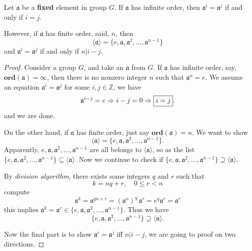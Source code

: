 \begin{theorem}
    Let $\mathfrak{a}$ be a \textbf{fixed} element in group $G$. If $\mathfrak{a}$ has infinite order, then $\mathfrak{a}^i = \mathfrak{a}^j$
    if and only if $i = j$.

    However, if $\mathfrak{a}$ has finite order, said, $n$, then 
    \begin{equation}
        \langle \mathfrak{a} \rangle = \{ e, \mathfrak{a}, \mathfrak{a}^2, \ldots, \mathfrak{a}^{n-1} \}
    \end{equation}
    and $\mathfrak{a}^i = \mathfrak{a}^j$
    if and only if $n | i - j$.
\end{theorem}
\begin{proof}
    Consider a group $G$, and take an $\mathfrak{a}$ from $G$. If $\mathfrak{a}$ has infinite order, say, 
    $\textbf{ord}(\mathfrak{a}) = \infty$, then there is no nonzero integer $n$ such that $\mathfrak{a}^n = e$.
    We assume an equation $\mathfrak{a}^i = \mathfrak{a}^j$ for some $i,j \in \mathbb{Z}$, we have 
    \[
        \mathfrak{a}^{i-j} = e \Rightarrow i - j = 0 \Rightarrow \fbox{$i = j$}.
    \]
    and we are done.

    On the other hand, if $\mathfrak{a}$ has finite order, just say $\textbf{ord}(\mathfrak{a}) = n$. We want to show 
    \[
        \langle \mathfrak{a} \rangle = \{ e, \mathfrak{a}, \mathfrak{a}^2, \ldots, \mathfrak{a}^{n-1} \}.
    \]
    Apparently, $e, \mathfrak{a}, \mathfrak{a}^2, \ldots, \mathfrak{a}^{n-1}$ are all belongs to $\langle \mathfrak{a} \rangle$, so as the list 
    $\{ e, \mathfrak{a}, \mathfrak{a}^2, \ldots, \mathfrak{a}^{n-1} \} \subseteq \langle \mathfrak{a} \rangle$.
    Now we continue to check if $\{ e, \mathfrak{a}, \mathfrak{a}^2, \ldots, \mathfrak{a}^{n-1} \} \supseteq \langle \mathfrak{a} \rangle$.

    By \textit{division algorithm}, there exists some integers $q$ and $r$ such that 
    \[
        k = nq + r,\quad  0 \leq r < n
    \]
    compute 
    \[
        \mathfrak{a}^k = \mathfrak{a}^{qn+r} = (\mathfrak{a}^n)^{q}\, \mathfrak{a}^r = e^q \mathfrak{a}^r = \mathfrak{a}^r
    \]
    this implies $\mathfrak{a}^k = \mathfrak{a}^r \in \{ e, \mathfrak{a}, \mathfrak{a}^2, \ldots, \mathfrak{a}^{n-1} \}$. Thus we have 
    \[
        \{ e, \mathfrak{a}, \mathfrak{a}^2, \ldots, \mathfrak{a}^{n-1} \} \supseteq \langle \mathfrak{a} \rangle.
    \]

    Now the final part is to show $\mathfrak{a}^i = \mathfrak{a}^j$ iff $n|i-j$, we are going to proof on two directions.


\end{proof}
